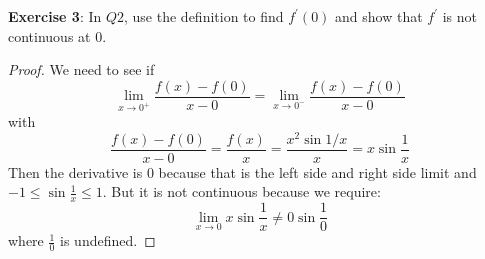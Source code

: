 \documentclass{article}
\begin{document}
\textbf{Exercise 3}: In $Q2$, use the definition to find $f^{\prime}(0)$ and show that $f^{\prime}$ is not continuous at $0$.
    \begin{proof}
        We need to see if
            \begin{equation*}
                \lim\limits_{x \to 0^{+}}\dfrac{f(x) - f(0)}{x - 0} = \lim\limits_{x \to 0^{-}} \dfrac{f(x) - f(0)}{x - 0}
            \end{equation*}
        with
            \begin{equation*}
                \dfrac{f(x) - f(0)}{x - 0} = \dfrac{f(x)}{x} = \dfrac{x^{2}\sin{1/x}}{x} = x\sin{\dfrac{1}{x}}
            \end{equation*}
        Then the derivative is $0$ because that is the left side and right side limit and $-1 \leq \sin{\frac{1}{x}} \leq 1$. But it is not continuous because we require:
            \begin{equation*}
                \lim\limits_{x \to 0}x\sin{\dfrac{1}{x}} \neq 0\sin{\dfrac{1}{0}}
            \end{equation*}
        where $\frac{1}{0}$ is undefined.
    \end{proof}
\end{document}
